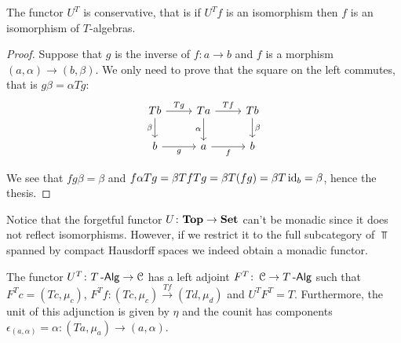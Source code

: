 \documentclass[a4paper,11pt,oneside,openany]{scrbook}
\begin{document}
	\begin{lemma}
		The functor $U^T$ is conservative, that is if $U^Tf$ is an isomorphism then $f$ is an isomorphism of $T$-algebras.
	\end{lemma}
	\begin{proof}
		Suppose that $g$ is the inverse of $f\colon a\rightarrow b$ and $f$ is a morphism $(a,\alpha)\rightarrow (b,\beta)$. We only need to prove that the square on the left commutes, that is $g\beta=\alpha Tg$:
		\[
			\begin{tikzcd}
				Tb\arrow["\beta"']{d}\arrow["Tg"]{r}
				& Ta\arrow["\alpha"']{d}\arrow["Tf"]{r}
				& Tb\arrow["\beta"]{d} \\
				b\arrow["g"']{r}
				& a\arrow["f"']{r}
				& b
			\end{tikzcd}
		\]
		
	We see that $fg\beta=\beta$ and $f\alpha Tg=\beta Tf Tg=\beta T(fg)=\beta T\operatorname{id}_b=\beta$, hence the thesis.
	\end{proof}
    \begin{rmk}
     Notice that the forgetful functor $U\colon{\normalfont\textbf{Top}}\to{\normalfont\textbf{Set}}$ can't be monadic since it does not reflect isomorphisms. However, if we restrict it to the full subcategory of $\Top$ spanned by compact Hausdorff spaces we indeed obtain a monadic functor.
    \end{rmk}
	\begin{prop}
		The functor $U^T\colon T\operatorname{-\mathsf{Alg}}\rightarrow\operatorname{\mathcal{C}}$ has a left adjoint $F^T\colon\operatorname{\mathcal{C}}\rightarrow T\operatorname{-\mathsf{Alg}}$ such that $F^Tc=(Tc,\mu_{c})$, $F^Tf\colon(Tc,\mu_{c})\xrightarrow{Tf} (Td,\mu_{d})$ and $U^TF^T=T$. Furthermore, the unit of this adjunction is given by $\eta$ and the counit has components $\epsilon_{(a,\alpha)}=\alpha\colon(Ta,\mu_a)\to(a,\alpha)$.
	\end{prop}
\end{document}

